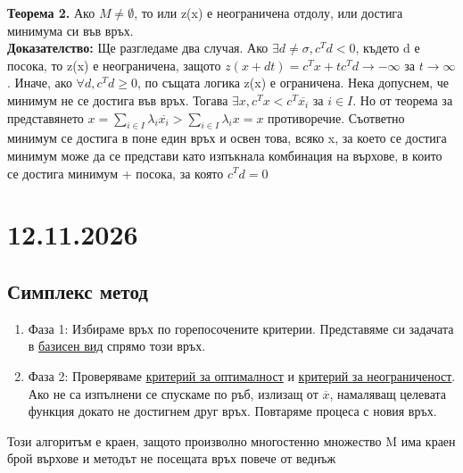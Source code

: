 \documentclass[12pt, a4paper]{article}
\begin{document}
\textbf{Теорема 2.} Ако $M\ne\emptyset$, то или z(x) е неограничена отдолу, или достига минимума си във връх.\\
\textbf{Доказателство:} Ще разгледаме два случая. Ако $\exists d\ne\sigma, c^Td<0$, където d е посока, то z(x) е неограничена, защото $z(x+dt) = c^Tx +t c^Td \rightarrow -\infty$ за $t\rightarrow\infty$. Иначе, ако $\forall d, c^Td\geq0$, по същата логика z(x) е ограничена. Нека допуснем, че минимум не се достига във връх. Тогава $\exists x, c^Tx<c^T\overline{x_i}$ за $i\in I$. Но от теорема за представянето $x=\sum_{i\in I}\lambda_i\overline{x_i}>\sum_{i\in I}\lambda_ix=x$ противоречие. Съответно минимум се достига в поне един връх и освен това, всяко x, за което се достига минимум може да се представи като изпъкнала комбинация на върхове, в които се достига минимум + посока, за която $c^Td = 0$

{\centering\section*{12.11.2026}}
\subsection*{Симплекс метод}
\begin{enumerate}
	\item Фаза 1: Избираме връх по горепосочените критерии. Представяме си задачата в \underline{базисен вид} спрямо този връх.
	\item Фаза 2: Проверяваме \underline{критерий за оптималност} и \underline{критерий за неограниченост}. Ако не са изпълнени се спускаме по ръб, излизащ от $\overline{x}$, намаляващ целевата функция докато не достигнем друг връх. Повтаряме процеса с новия връх.
\end{enumerate}
Този алгоритъм е краен, защото произволно многостенно множество M има краен брой върхове и методът не посещата връх повече от веднъж\\
\end{document}
